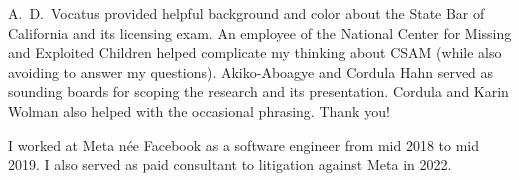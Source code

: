 \documentclass[authorversion,nonacm,screen]{acmart}
\begin{document}
\begin{acks}
A.\ D.\ Vocatus provided helpful background and color about the State Bar of
California and its licensing exam. An employee of the National Center for
Missing and Exploited Children helped complicate my thinking about CSAM (while
also avoiding to answer my questions). Akiko-Aboagye and Cordula Hahn served as
sounding boards for scoping the research and its presentation. Cordula and Karin
Wolman also helped with the occasional phrasing. Thank you!

I worked at Meta n\'ee Facebook as a software engineer from mid 2018 to mid
2019. I also served as paid consultant to litigation against Meta in 2022.
\end{acks}




\newpage
\appendix







\end{document}
